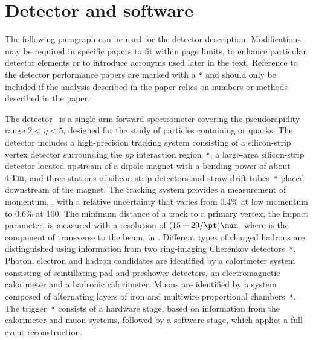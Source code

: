 \section{Detector and software}
\label{sec:Detector}
The following paragraph can be used for the detector
description. Modifications may be required in specific papers to fit
within page limits, to enhance particular detector elements or to
introduce acronyms used later in the text.
Reference to the detector performance papers are marked with a \verb!*!
and should only be included if the analysis described in the paper
relies on numbers or methods described in the paper.

The \lhcb detector~\cite{Alves:2008zz} is a single-arm forward
spectrometer covering the \mbox{pseudorapidity} range $2<\eta <5$,
designed for the study of particles containing \bquark or \cquark
quarks. The detector includes a high-precision tracking system
consisting of a silicon-strip vertex detector surrounding the $pp$
interaction region~\cite{LHCb-DP-2014-001}\verb!*!, a large-area silicon-strip detector located
upstream of a dipole magnet with a bending power of about
$4{\rm\,Tm}$, and three stations of silicon-strip detectors and straw
drift tubes~\cite{LHCb-DP-2013-003}\verb!*! placed downstream of the magnet.
The tracking system provides a measurement of momentum, \ptot,  with
a relative uncertainty that varies from 0.4\% at low momentum to 0.6\% at 100\gevc.
The minimum distance of a track to a primary vertex, the impact parameter, is measured with a resolution of $(15+29/\pt)\mum$,
where \pt is the component of \ptot transverse to the beam, in \gevc.
Different types of charged hadrons are distinguished using information
from two ring-imaging Cherenkov detectors~\cite{LHCb-DP-2012-003}\verb!*!. Photon, electron and
hadron candidates are identified by a calorimeter system consisting of
scintillating-pad and preshower detectors, an electromagnetic
calorimeter and a hadronic calorimeter. Muons are identified by a
system composed of alternating layers of iron and multiwire
proportional chambers~\cite{LHCb-DP-2012-002}\verb!*!.
The trigger~\cite{LHCb-DP-2012-004}\verb!*! consists of a
hardware stage, based on information from the calorimeter and muon
systems, followed by a software stage, which applies a full event
reconstruction.

